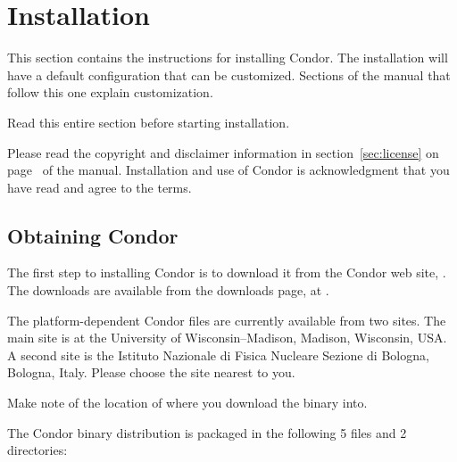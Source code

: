 \section{\label{sec:install}Installation}

This section contains the instructions for installing Condor.
The installation will have a default configuration that can
be customized.
Sections of the manual that follow this one explain customization.

Read this entire section before starting installation.

Please read the copyright and disclaimer information in 
section~\ref{sec:license} on
page~\pageref{sec:license} of the manual.
Installation and
use of Condor is acknowledgment that you have read and agree to the
terms.

\subsection{\label{sec:pre-install-procedure}
Obtaining Condor}
The first step to installing Condor is to download it from the Condor
web site, .
The downloads are available from the downloads page,
at .

The platform-dependent Condor files are currently available from two sites.
The main site is at the University of Wisconsin--Madison,
Madison, Wisconsin, USA.
A second site is the Istituto Nazionale di Fisica Nucleare Sezione di
Bologna, Bologna, Italy.
Please choose the site nearest to you.

Make note of the location of where you download the binary into.

The Condor binary distribution is packaged in the following 5 files
and 2 directories:

